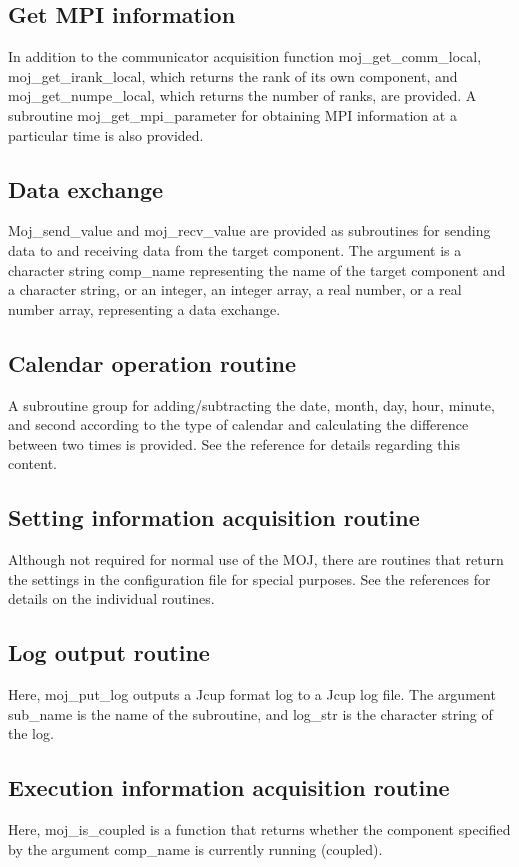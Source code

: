 \documentclass[11pt,a4paper]{report}
\begin{document}
\subsection{Get MPI information}
In addition to the communicator acquisition function moj\_get\_comm\_local, moj\_get\_irank\_local, which returns the rank of its own component, and moj\_get\_numpe\_local, which returns the number of ranks, are provided. 
A subroutine moj\_get\_mpi\_parameter for obtaining MPI information at a particular time is also provided.

\subsection{Data exchange}
Moj\_send\_value and moj\_recv\_value are provided as subroutines for sending data to and receiving data from the target component. 
The argument is a character string comp\_name representing the name of the target component and a character string, or an integer, an integer array, a real number, or a real number array, representing a data exchange.

\subsection{Calendar operation routine}
A subroutine group for adding/subtracting the date, month, day, hour, minute, and second according to the type of calendar and calculating the difference between two times is provided. 
See the reference for details regarding this content.

\subsection{Setting information acquisition routine}
Although not required for normal use of the MOJ, there are routines that return the settings in the configuration file for special purposes. 
See the references for details on the individual routines.

\subsection{Log output routine}
Here, moj\_put\_log outputs a Jcup format log to a Jcup log file. The argument sub\_name is the name of the subroutine, and log\_str is the character string of the log.

\subsection{Execution information acquisition routine}
Here, moj\_is\_coupled is a function that returns whether the component specified by the argument comp\_name is currently running (coupled).
\end{document}
